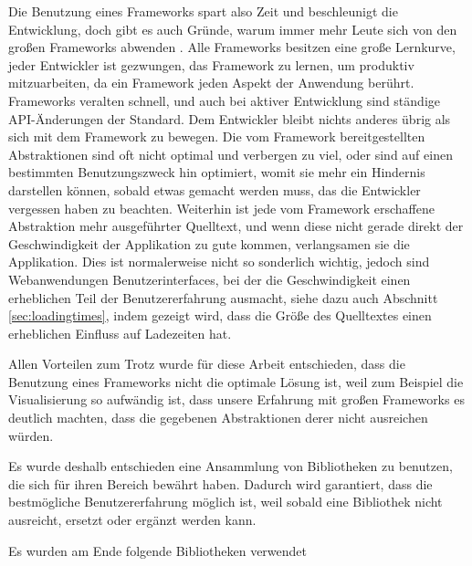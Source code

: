 \documentclass[12pt,twoside]{book}
\begin{document}
Die Benutzung eines Frameworks spart also Zeit und beschleunigt die Entwicklung, doch gibt es auch Gründe, warum immer mehr Leute sich von den großen Frameworks abwenden \cite{nomoreframeworks, frameworkless}.
Alle Frameworks besitzen eine große Lernkurve, jeder Entwickler ist gezwungen, das Framework zu lernen, um produktiv mitzuarbeiten, da ein Framework jeden Aspekt der Anwendung berührt. Frameworks veralten schnell, und auch bei aktiver Entwicklung sind ständige API-Änderungen der Standard. Dem Entwickler bleibt nichts anderes übrig als sich mit dem Framework zu bewegen. Die vom Framework bereitgestellten Abstraktionen sind oft nicht optimal und verbergen zu viel, oder sind auf einen bestimmten Benutzungszweck hin optimiert, womit sie mehr ein Hindernis darstellen können, sobald etwas gemacht werden muss, das die Entwickler vergessen haben zu beachten.
Weiterhin ist jede vom Framework erschaffene Abstraktion mehr ausgeführter Quelltext, und wenn diese nicht gerade direkt der Geschwindigkeit der Applikation zu gute kommen, verlangsamen sie die Applikation. Dies ist normalerweise nicht so sonderlich wichtig, jedoch sind Webanwendungen Benutzerinterfaces, bei der die Geschwindigkeit einen erheblichen Teil der Benutzererfahrung ausmacht, siehe dazu auch Abschnitt \ref{sec:loadingtimes}, indem gezeigt wird, dass die Größe des Quelltextes einen erheblichen Einfluss auf Ladezeiten hat.

Allen Vorteilen zum Trotz wurde für diese Arbeit entschieden, dass die Benutzung eines Frameworks nicht die optimale Lösung ist, weil zum Beispiel die Visualisierung so aufwändig ist, dass unsere Erfahrung mit großen Frameworks es deutlich machten, dass die gegebenen Abstraktionen derer nicht ausreichen würden.

Es wurde deshalb entschieden eine Ansammlung von Bibliotheken zu benutzen, die sich für ihren Bereich bewährt haben. Dadurch wird garantiert, dass die bestmögliche Benutzererfahrung möglich ist, weil sobald eine Bibliothek nicht ausreicht, ersetzt oder ergänzt werden kann.

Es wurden am Ende folgende Bibliotheken verwendet
\end{document}
